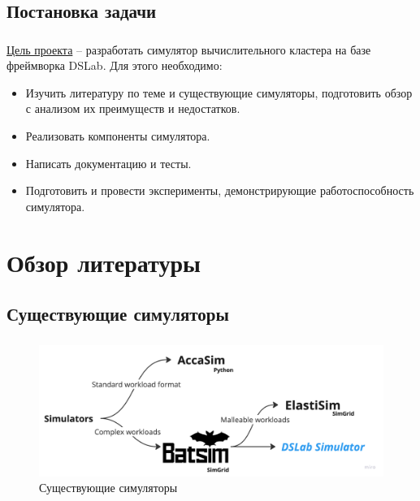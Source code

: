 \documentclass[t]{beamer}  %
\begin{document}
	

	 
	\subsection{Постановка задачи}
	\begin{frame}[fragile]
		\frametitle{\insertsection} 
		\framesubtitle{\insertsubsection}
		\vspace{0.5cm}
		\underline{Цель проекта} -- разработать симулятор вычислительного кластера на базе фреймворка DSLab. Для этого необходимо:
		\begin{itemize}
			\item Изучить литературу по теме и существующие симуляторы, подготовить обзор с анализом
			их преимуществ и недостатков.
			\item Реализовать компоненты симулятора.
			\item Написать документацию и тесты.
			\item Подготовить и провести эксперименты, демонстрирующие работоспособность симулятора.
		\end{itemize}
	\end{frame}






	\section{Обзор литературы}
	\subsection{Существующие симуляторы}
	\begin{frame}
		\frametitle{\insertsection} 
		\framesubtitle{\insertsubsection}

		\begin{figure}[H]
			\hspace{-1.1cm}
			\centering
			\includegraphics[width=1.1\linewidth]{images/simulators}
			\vspace{0.2cm}
			\caption*{Существующие симуляторы}
		\end{figure}
	\end{frame}
\end{document}
